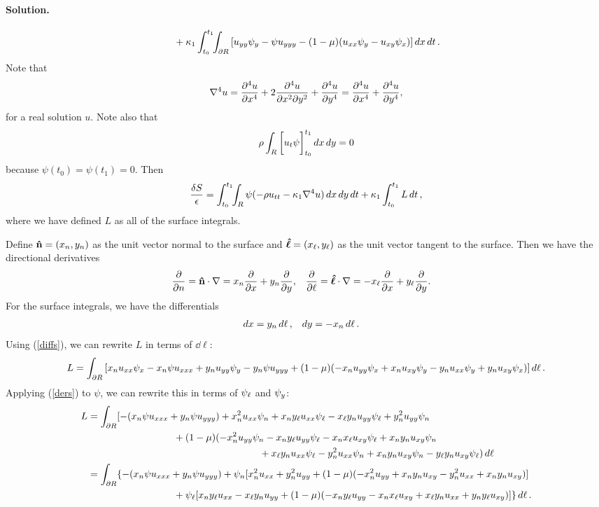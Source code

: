 \documentclass[11pt]{article}
\newcommand{\refeq}[1]{(\ref{#1})}
\newcommand{\beq}{\begin{equation*}}
\newcommand{\eeq}{\end{equation*}}
\newcommand{\beqn}{\begin{equation}}
\newcommand{\eeqn}{\end{equation}}
\newenvironment{solution}
{
    \paragraph{Solution.}
    \ignorespaces
}
{
}
\begin{document}
\begin{solution}
\begin{align*}
		&\phantom{=\ } + \kappa_1 \int_{t_0}^{t_1} \!\!\int_{\partial R} \left[ u_{yy} \psi_{y} - \psi u_{yyy} - (1 - \mu) (u_{xx} \psi_{y} - u_{xy} \psi_{x}) \right] \dd{x} \dd{t}.
	\end{align*}
	Note that
	\beqn \label{lapla}
		\lapw u = \pdv[4]{u}{x} + 2 \frac{\partial^4 u}{\partial x^2 \partial y^2} + \pdv[4]{u}{y} = \pdv[4]{u}{x} + \pdv[4]{u}{y},
	\eeqn
	for a real solution $u$.  Note also that
	\beq
		\rho \intr \bigg[\ut \psi\bigg]_{t_0}^{t_1} \dd{x} \dd{y} = 0
	\eeq
	because $\psi(t_0) = \psi(t_1) = 0$.  Then
	\beqn \label{final}
		\frac{\dS}{\eps} = \inttr \psi (-\rho \utt - \kaq \lapw u) \drt + \kaq \intt L \dd{t},
	\eeqn
	where we have defined $L$ as all of the surface integrals.

	Define $\mathbf{\hat{n}} = (x_n, y_n)$ as the unit vector normal to the surface and $\boldsymbol{\hat{\ell}} = (x_\ell, y_\ell)$ as the unit vector tangent to the surface.  Then we have the directional derivatives
	\begin{align} \label{ders}
		\pdv{}{n} &= \mathbf{\hat{n}} \cdot \nabla = x_n \pdv{}{x} + y_n \pdv{}{y}, &
		\pdv{}{\ell} &= \boldsymbol{\hat{\ell}} \cdot \nabla = -x_\ell \pdv{}{x} + y_\ell \pdv{}{y}.
	\end{align}
	For the surface integrals, we have the differentials
	\begin{align} \label{diffs}
		\dd{x} &= y_n \dd{\ell}, &
		\dd{y} &= -x_n \dd{\ell}.
	\end{align}
	Using \refeq{diffs}, we can rewrite $L$ in terms of $\dd{\ell}$:
	\beq
		L = \intdr \left[ \xn \uxx \psix - \xn \psi \uxxx + \yn \uyy \psiy - \yn \psi \uyyy + (1 - \mu) (-\xn \uyy \psix + \xn \uxy \psiy - \yn \uxx \psiy + \yn \uxy \psix) \right] \dd{\ell}.
	\eeq
	Applying \refeq{ders} to $\psi$, we can rewrite this in terms of $\psi_\ell$ and $\psi_{y}$:
\begin{align*}
		L &= \intdr [ - (\xn \psi \uxxx + \yn \psi \uyyy) + \xn^2 \uxx \psin + \xn \yl \uxx \psil - \xl \yn \uyy \psil + \yn^2 \uyy \psin \\
		&\phantom{mmmmmmmmmm} + (1 - \mu) (-\xn^2 \uyy \psin - \xn \yl \uyy \psil - \xn \xl \uxy \psil + \xn \yn \uxy \psin \\
		&\phantom{mmmmmmmmmmmmmmmmmmmm} + \xl \yn \uxx \psil - \yn^2 \uxx \psin + \xn \yn \uxy \psin - \yl \yn \uxy \psil) \dd{\ell} \\
		&= \intdr \{ - (\xn \psi \uxxx + \yn \psi \uyyy) + \psin [\xn^2 \uxx + \yn^2 \uyy + (1 - \mu) (-\xn^2 \uyy + \xn \yn \uxy - \yn^2 \uxx + \xn \yn \uxy)] \\
		&\phantom{mmmmmmmmmm} + \psil [\xn \yl \uxx - \xl \yn \uyy + (1 - \mu) (-\xn \yl \uyy - \xn \xl \uxy + \xl \yn \uxx + \yn \yl \uxy)] \} \dd{\ell}.

\end{align*}
\end{solution}
\end{document}

